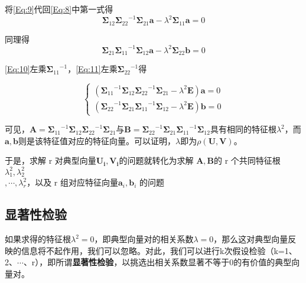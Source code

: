 \documentclass[withoutpreface]{cumcmthesis}
\begin{document}
将\cref{Eq:9}代回\cref{Eq:8}中第一式得
\begin{equation}\label{Eq:10}
    {\boldsymbol{\Sigma}_{12}}{\boldsymbol{\Sigma}_{22}}^{-1} {\boldsymbol{\Sigma}_{21}}\mathbf{a}-\lambda^2{\boldsymbol{\Sigma}_{11}}\mathbf{a}=0
\end{equation}

同理得
\begin{equation}\label{Eq:11}
    {\boldsymbol{\Sigma}_{21}}{\boldsymbol{\Sigma}_{11}}^{-1} {\boldsymbol{\Sigma}_{12}}\mathbf{a}-\lambda^2{\boldsymbol{\Sigma}_{22}}\mathbf{b}=0
\end{equation}

\cref{Eq:10}左乘${\boldsymbol{\Sigma}_{11}}^{-1}$，\cref{Eq:11}左乘${\boldsymbol{\Sigma}_{22}}^{-1}$得

\begin{equation}
    \begin{cases}
        ({\boldsymbol{\Sigma}_{11}}^{-1}{\boldsymbol{\Sigma}_{12}}{\boldsymbol{\Sigma}_{22}}^{-1} {\boldsymbol{\Sigma}_{21}}-\lambda^2\mathbf{E})\mathbf{a}=0 \\
        ({\boldsymbol{\Sigma}_{22}}^{-1}{\boldsymbol{\Sigma}_{21}}{\boldsymbol{\Sigma}_{11}}^{-1} {\boldsymbol{\Sigma}_{12}}-\lambda^2\mathbf{E})\mathbf{b}=0
    \end{cases}
\end{equation}

可见，$\mathbf{A}={\boldsymbol{\Sigma}_{11}}^{-1}{\boldsymbol{\Sigma}_{12}}{\boldsymbol{\Sigma}_{22}}^{-1} {\boldsymbol{\Sigma}_{21}}$与$\mathbf{B}={\boldsymbol{\Sigma}_{22}}^{-1}{\boldsymbol{\Sigma}_{21}}{\boldsymbol{\Sigma}_{11}}^{-1} {\boldsymbol{\Sigma}_{12}}$具有相同的特征根$\lambda^2$，而$\mathbf{a},\mathbf{b}$则是该特征值对应的特征向量。可以证明，$\lambda$即为$\rho (\mathbf{U},\mathbf{V})$。

于是，求解 r 对典型向量$\mathbf{U_i},\mathbf{V_i}$的问题就转化为求解 $\mathbf{A},\mathbf{B}$的 r 个共同特征根
$\lambda_1^2,\lambda_2^2$\\
$,\cdots,\lambda_r^2$，以及 r 组对应特征向量$\mathbf{a}_i,\mathbf{b}_i$ 的问题

\subsection{显著性检验}
如果求得的特征根$\lambda^2=0$，即典型向量对的相关系数$\lambda=0$，那么这对典型向量反映的信息将不起作用，我们可以忽略。对此，我们可以进行k次假设检验（k=1、2、$\cdots$、r），即所谓\textbf{显著性检验}，以挑选出相关系数显著不等于0的有价值的典型向量对。
\end{document}
